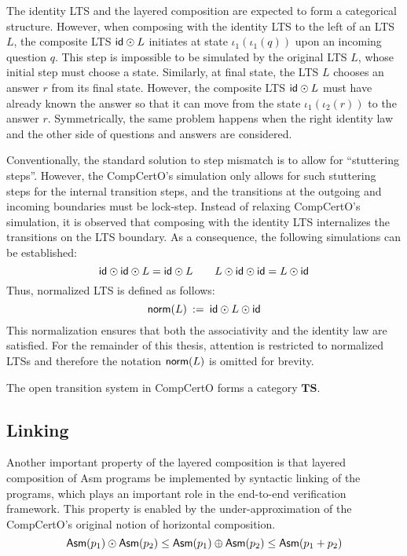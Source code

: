The identity LTS and the layered composition are expected to form a categorical
structure. However, when composing with the identity LTS to the left of an LTS
$L$, the composite LTS $ \mathsf{id}  \odot L$ initiates at state
$\iota_1(\iota_1(q))$ upon an incoming question $q$. This step is impossible to
be simulated by the original LTS $L$, whose initial step must choose a state.
Similarly, at final state, the LTS $L$ chooses an answer $r$ from its final
state. However, the composite LTS $ \mathsf{id}  \odot L$ must have already known the
answer so that it can move from the state $\iota_1(\iota_2(r))$ to the answer
$r$. Symmetrically, the same problem happens when the right identity law and the
other side of questions and answers are considered.

Conventionally, the standard solution to step mismatch is to allow for
``stuttering steps''. However, the CompCertO's simulation only allows for such
stuttering steps for the internal transition steps, and the transitions at the
outgoing and incoming boundaries must be lock-step. Instead of relaxing
CompCertO's simulation, it is observed that composing with the identity LTS
internalizes the transitions on the LTS boundary. As a consequence, the
following simulations can be established:
\[
   \mathsf{id}  \odot  \mathsf{id}  \odot L =  \mathsf{id}  \odot L
  \qquad
  L \odot  \mathsf{id}  \odot  \mathsf{id}  = L \odot  \mathsf{id} 
\]
Thus, normalized LTS is defined as follows:
\[
   \mathsf{norm} (L) \::=\:  \mathsf{id}  \odot L \odot  \mathsf{id} 
\]
This normalization ensures that
both the associativity and the identity law are satisfied.
For the remainder of this thesis,
attention is restricted to normalized LTSs
and therefore the notation $ \mathsf{norm} (L)$ is omitted
for brevity.

\begin{theorem}
  \label{thm:ox:ts}
  The open transition system in CompCertO forms a category $\mathbf{TS}$.
\end{theorem}

\subsection{Linking}

Another important property of the layered composition is that layered
composition of Asm programs be implemented by syntactic linking of the programs,
which plays an important role in the end-to-end verification framework. This
property is enabled by the under-approximation of the CompCertO's original
notion of horizontal composition.
\[
   \mathsf{Asm} (p_1) \odot  \mathsf{Asm} (p_2)
  \le  \mathsf{Asm} (p_1) \oplus  \mathsf{Asm} (p_2)
  \le  \mathsf{Asm} (p_1 + p_2)
\]

